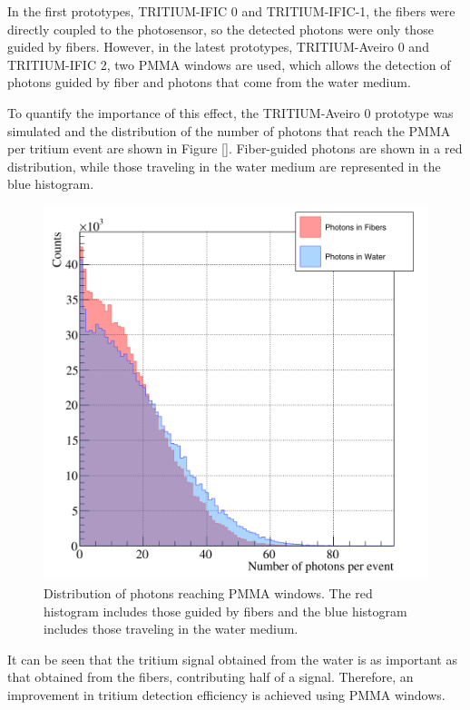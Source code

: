 In the first prototypes, TRITIUM-IFIC 0 and TRITIUM-IFIC-1, the fibers were directly coupled to the photosensor, so the detected photons were only those guided by fibers. However, in the latest prototypes, TRITIUM-Aveiro 0 and TRITIUM-IFIC 2, two PMMA windows are used, which allows the detection of photons guided by fiber and photons that come from the water medium.

To quantify the importance of this effect, the TRITIUM-Aveiro 0 prototype was simulated and the distribution of the number of photons that reach the PMMA per tritium event are shown in Figure \ref{}. Fiber-guided photons are shown in a red distribution, while those traveling in the water medium are represented in the blue histogram.

\begin{figure}[h]
\centering
\includegraphics[scale=0.3]{Figures/8SimulationsResults/81TRITIUMDesign/815PMMA/PhotonsDetectedWaterFiber.png}
\caption{Distribution of photons reaching PMMA windows. The red histogram includes those guided by fibers and the blue histogram includes those traveling in the water medium.}
\end{figure}

It can be seen that the tritium signal obtained from the water is as important as that obtained from the fibers, contributing half of a signal. Therefore, an improvement in tritium detection efficiency is achieved using PMMA windows.